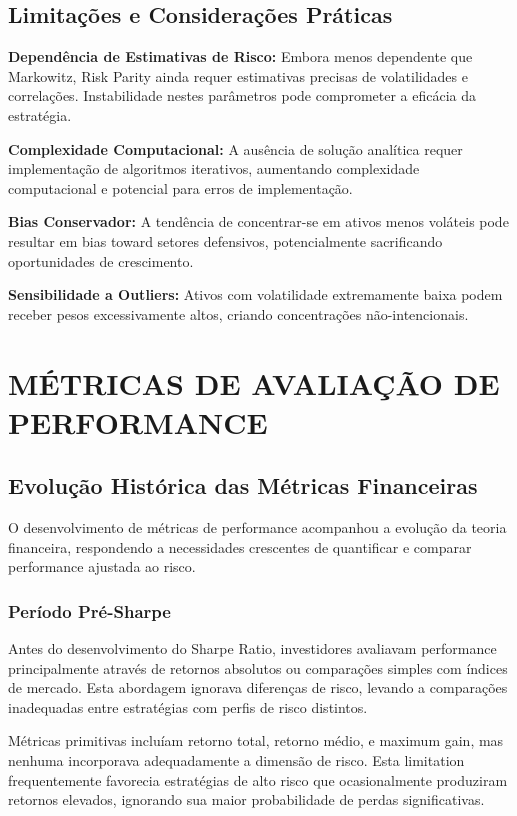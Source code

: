 \subsection{Limitações e Considerações Práticas}

\textbf{Dependência de Estimativas de Risco:} Embora menos dependente que Markowitz, Risk Parity ainda requer estimativas precisas de volatilidades e correlações. Instabilidade nestes parâmetros pode comprometer a eficácia da estratégia.

\textbf{Complexidade Computacional:} A ausência de solução analítica requer implementação de algoritmos iterativos, aumentando complexidade computacional e potencial para erros de implementação.

\textbf{Bias Conservador:} A tendência de concentrar-se em ativos menos voláteis pode resultar em bias toward setores defensivos, potencialmente sacrificando oportunidades de crescimento.

\textbf{Sensibilidade a Outliers:} Ativos com volatilidade extremamente baixa podem receber pesos excessivamente altos, criando concentrações não-intencionais.

\section{MÉTRICAS DE AVALIAÇÃO DE PERFORMANCE}

\subsection{Evolução Histórica das Métricas Financeiras}

O desenvolvimento de métricas de performance acompanhou a evolução da teoria financeira, respondendo a necessidades crescentes de quantificar e comparar performance ajustada ao risco.

\subsubsection{Período Pré-Sharpe}

Antes do desenvolvimento do Sharpe Ratio, investidores avaliavam performance principalmente através de retornos absolutos ou comparações simples com índices de mercado. Esta abordagem ignorava diferenças de risco, levando a comparações inadequadas entre estratégias com perfis de risco distintos.

Métricas primitivas incluíam retorno total, retorno médio, e maximum gain, mas nenhuma incorporava adequadamente a dimensão de risco. Esta limitation frequentemente favorecia estratégias de alto risco que ocasionalmente produziram retornos elevados, ignorando sua maior probabilidade de perdas significativas.

